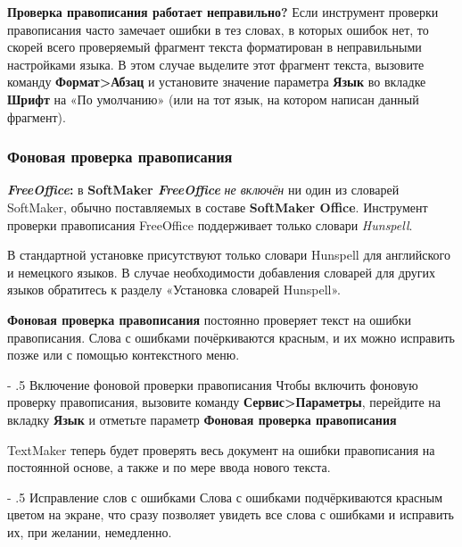 ﻿\documentclass[a4paper,10pt]{article}
\makeatletter
\renewcommand\paragraph{%
   \@startsection{paragraph}{4}{0mm}%
      {-\baselineskip}%
      {.5\baselineskip}%
      {\normalfont\normalsize\bfseries}}
\makeatother
\begin{document}
\textbf{Проверка правописания работает неправильно?} Если инструмент проверки правописания часто замечает ошибки в тез словах, в которых ошибок нет, то скорей всего проверяемый фрагмент текста форматирован в неправильными настройками языка. В этом случае выделите этот фрагмент текста, вызовите команду \textbf{Формат>Абзац} и установите значение параметра \textbf{Язык} во вкладке \textbf{Шрифт} на «По умолчанию» (или на тот язык, на котором написан данный фрагмент).

\subsubsection{Фоновая проверка правописания}
\begin{mdframed}[backgroundcolor=pink!50]
\textbf{\textit{FreeOffice}:} в \textbf{SoftMaker \textit{FreeOffice}} \textit{не включён} ни один из словарей SoftMaker, обычно поставляемых в составе \textbf{SoftMaker Office}. Инструмент проверки правописания FreeOffice поддерживает только словари \textit{Hunspell}.

В стандартной установке присутствуют только словари Hunspell для английского и немецкого языков. В случае необходимости добавления словарей для других языков обратитесь к разделу «Установка словарей Hunspell».
\end{mdframed}

\textbf{Фоновая проверка правописания} постоянно проверяет текст на ошибки правописания. Слова с ошибками почёркиваются красным, и их можно исправить позже или с помощью контекстного меню.

\paragraph{Включение фоновой проверки правописания}
Чтобы включить фоновую проверку правописания, вызовите команду \textbf{Сервис>Параметры}, перейдите на вкладку \textbf{Язык} и отметьте параметр \textbf{Фоновая проверка правописания}

TextMaker теперь будет проверять весь документ на ошибки правописания на постоянной основе, а также и по мере ввода нового текста.

\paragraph{Исправление слов с ошибками}
Слова с ошибками подчёркиваются красным цветом на экране, что сразу позволяет увидеть все слова с ошибками и исправить их, при желании, немедленно.
\end{document}
